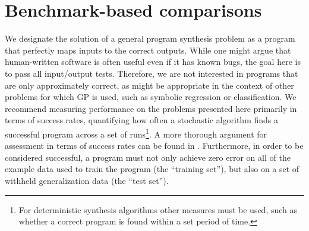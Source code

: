 \documentclass{sig-alternate}
\begin{document}


\section{Benchmark-based comparisons}


We designate the solution of a general program synthesis problem as a program that perfectly maps inputs to the correct outputs. While one might argue that human-written software is often useful even if it has known bugs, the goal here is to pass all input/output tests. Therefore, we are not interested in programs that are only approximately correct, as might be appropriate in the context of other problems for which GP is used, such as symbolic regression or classification. We recommend measuring performance on the problems presented here primarily in terms of success rates, quantifying how often a stochastic algorithm finds a successful program across a set of runs\footnote{For deterministic synthesis algorithms other measures must be used, such as whether a correct program is found within a set period of time.}. A more thorough argument for assessment in terms of success rates can be found in \cite{Helmuth:2014:GECCO}.
Furthermore, in order to be considered successful, a program must not only achieve zero error on all of the example data used to train the program (the ``training set''), but also on a set of withheld generalization data (the ``test set''). 


\end{document}

